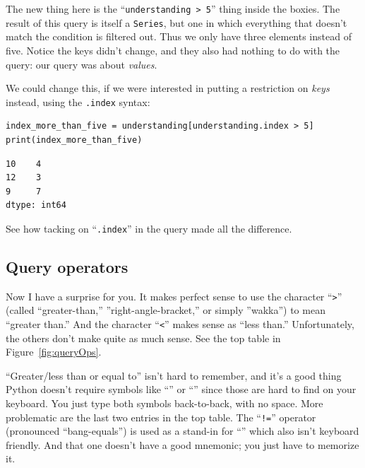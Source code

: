 The new thing here is the ``\texttt{understanding > 5}'' thing inside the
boxies. The result of this query is itself a \texttt{Series}, but one in which
everything that doesn't match the condition is filtered out. Thus we only have
three elements instead of five. Notice the keys didn't change, and they also
had nothing to do with the query: our query was about \textit{values}.


We could change this, if we were interested in putting a restriction on
\textit{keys} instead, using the \texttt{.index} syntax:

\begin{Verbatim}[fontsize=\footnotesize,samepage=true,frame=single,framesep=3mm]
index_more_than_five = understanding[understanding.index > 5]
print(index_more_than_five)
\end{Verbatim}

\begin{Verbatim}[fontsize=\small,samepage=true,frame=leftline,framesep=5mm,framerule=1mm]
10    4
12    3
9     7
dtype: int64
\end{Verbatim}

See how tacking on ``\texttt{.index}'' in the query made all the difference.

\subsection{Query operators}


Now I have a surprise for you. It makes perfect sense to use the character
``\texttt{>}'' (called ``greater-than,'' ''right-angle-bracket,'' or simply
''wakka'') to mean ``greater than.'' And the character ``\texttt{<}'' makes
sense as ``less than.'' Unfortunately, the others don't make quite as much
sense. See the top table in Figure~\ref{fig:queryOps}.


``Greater/less than or equal to'' isn't hard to remember, and it's a good thing
Python doesn't require symbols like ``'' or ``'' since those are hard
to find on your keyboard. You just type both symbols back-to-back, with no
space. More problematic are the last two entries in the top table. The
``\texttt{!=}'' operator (pronounced ``bang-equals'') is used as a stand-in
for ``'' which also isn't keyboard friendly. And that one doesn't have a
good mnemonic; you just have to memorize it.

